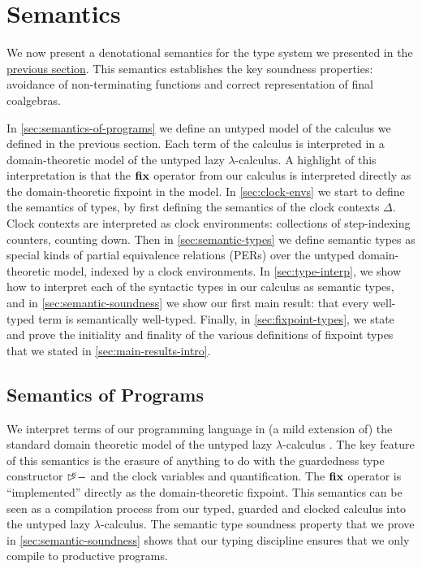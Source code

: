 \section{Semantics}\label{sec:semantics}

We now present a denotational semantics for the type system we
presented in the \hyperref[sec:type-system]{previous section}. This
semantics establishes the key soundness properties: avoidance of
non-terminating functions and correct representation of final
coalgebras.

In \autoref{sec:semantics-of-programs} we define an untyped model of
the calculus we defined in the previous section. Each term of the
calculus is interpreted in a domain-theoretic model of the untyped
lazy $\lambda$-calculus. A highlight of this interpretation is that
the $\textbf{fix}$ operator from our calculus is interpreted directly as
the domain-theoretic fixpoint in the model. In
\autoref{sec:clock-envs} we start to define the semantics of types, by
first defining the semantics of the clock contexts $\Delta$. Clock
contexts are interpreted as clock environments: collections of
step-indexing counters, counting down. Then in
\autoref{sec:semantic-types} we define semantic types as special kinds
of partial equivalence relations (PERs) over the untyped
domain-theoretic model, indexed by a clock environments. In
\autoref{sec:type-interp}, we show how to interpret each of the
syntactic types in our calculus as semantic types, and in
\autoref{sec:semantic-soundness} we show our first main result: that
every well-typed term is semantically well-typed. Finally, in
\autoref{sec:fixpoint-types}, we state and prove the initiality and
finality of the various definitions of fixpoint types that we stated
in \autoref{sec:main-results-intro}.

\subsection{Semantics of Programs}\label{sec:semantics-of-programs}

We interpret terms of our programming language in (a mild extension
of) the standard domain theoretic model of the untyped lazy
$\lambda$-calculus \cite{PittsAM:compavm}. The key feature of this
semantics is the erasure of anything to do with the guardedness type
constructor $\mathord{\rhd\kern-0.4em^{\kappa}}-$ and the clock variables and
quantification. The $\textbf{fix}$ operator is ``implemented'' directly as
the domain-theoretic fixpoint. This semantics can be seen as a
compilation process from our typed, guarded and clocked calculus into
the untyped lazy $\lambda$-calculus. The semantic type soundness
property that we prove in \autoref{sec:semantic-soundness} shows that
our typing discipline ensures that we only compile to productive
programs.

